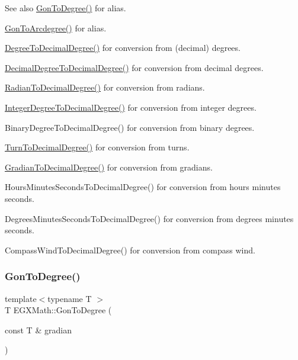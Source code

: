 \begin{DoxySeeAlso}{See also}
\mbox{\hyperlink{group___e_g_x_math-_angle_conversions-_gon_gaf1c40076eaf3be4e070ff34045db55d1}{Gon\+To\+Degree()}} for alias. 

\mbox{\hyperlink{group___e_g_x_math-_angle_conversions-_gon_ga00757282768841abe48ac3c8452627cb}{Gon\+To\+Arcdegree()}} for alias. 

\mbox{\hyperlink{group___e_g_x_math-_angle_conversions-_degree_ga568afc1d436d425bf5d4edea584aee08}{Degree\+To\+Decimal\+Degree()}} for conversion from (decimal) degrees. 

\mbox{\hyperlink{group___e_g_x_math-_angle_conversions-_decimal_degree_gafccf9cd779903872887978ab9d79661f}{Decimal\+Degree\+To\+Decimal\+Degree()}} for conversion from decimal degrees. 

\mbox{\hyperlink{group___e_g_x_math-_angle_conversions-_radian_ga6d170f1882c32de53167c04524d05f67}{Radian\+To\+Decimal\+Degree()}} for conversion from radians. 

\mbox{\hyperlink{group___e_g_x_math-_angle_conversions-_integer_degree_gac219c3198508ba984d8d81d22831b27d}{Integer\+Degree\+To\+Decimal\+Degree()}} for conversion from integer degrees. 

Binary\+Degree\+To\+Decimal\+Degree() for conversion from binary degrees. 

\mbox{\hyperlink{group___e_g_x_math-_angle_conversions-_turn_ga79231536255e77fb7a158b99a30c1767}{Turn\+To\+Decimal\+Degree()}} for conversion from turns. 

\mbox{\hyperlink{group___e_g_x_math-_angle_conversions-_gradian_ga346f47c519d5261b689cec49f4a8e789}{Gradian\+To\+Decimal\+Degree()}} for conversion from gradians. 

Hours\+Minutes\+Seconds\+To\+Decimal\+Degree() for conversion from hours minutes seconds. 

Degrees\+Minutes\+Seconds\+To\+Decimal\+Degree() for conversion from degrees minutes seconds. 

Compass\+Wind\+To\+Decimal\+Degree() for conversion from compass wind. 
\end{DoxySeeAlso}
\mbox{\label{group___e_g_x_math-_angle_conversions-_gon_gaf1c40076eaf3be4e070ff34045db55d1}} 
\subsubsection{\texorpdfstring{Gon\+To\+Degree()}{GonToDegree()}}
{\footnotesize\ttfamily template$<$typename T $>$ \\
T E\+G\+X\+Math\+::\+Gon\+To\+Degree (\begin{DoxyParamCaption}\item[{const T \&}]{gradian }\end{DoxyParamCaption})}



